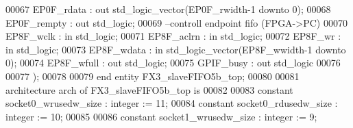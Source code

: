 \begin{DoxyCode}
00067                 \textcolor{vhdlchar}{EP0F_rdata}      \textcolor{vhdlchar}{:} \textcolor{keywordflow}{out} \textcolor{comment}{std\_logic\_vector}\textcolor{vhdlchar}{(}\textcolor{vhdlchar}{EP0F_rwidth}\textcolor{vhdlchar}{-}\textcolor{vhdllogic}{}\textcolor{vhdllogic}{1} \textcolor{keywordflow}{downto} \textcolor{vhdllogic}{}\textcolor{vhdllogic}{0}\textcolor{vhdlchar}{)};
00068                 \textcolor{vhdlchar}{EP0F_rempty}     \textcolor{vhdlchar}{:} \textcolor{keywordflow}{out} \textcolor{comment}{std\_logic};
00069 \textcolor{keyword}{                --controll endpoint fifo (FPGA->PC)}
00070                 \textcolor{vhdlchar}{EP8F_wclk}       \textcolor{vhdlchar}{:} \textcolor{keywordflow}{in} \textcolor{comment}{std\_logic};
00071                 \textcolor{vhdlchar}{EP8F_aclrn}      \textcolor{vhdlchar}{:} \textcolor{keywordflow}{in} \textcolor{comment}{std\_logic};
00072                 \textcolor{vhdlchar}{EP8F_wr}         \textcolor{vhdlchar}{:} \textcolor{keywordflow}{in} \textcolor{comment}{std\_logic};
00073                 \textcolor{vhdlchar}{EP8F_wdata}      \textcolor{vhdlchar}{:} \textcolor{keywordflow}{in} \textcolor{comment}{std\_logic\_vector}\textcolor{vhdlchar}{(}\textcolor{vhdlchar}{EP8F_wwidth}\textcolor{vhdlchar}{-}\textcolor{vhdllogic}{}\textcolor{vhdllogic}{1} \textcolor{keywordflow}{downto} \textcolor{vhdllogic}{}\textcolor{vhdllogic}{0}\textcolor{vhdlchar}{)};
00074                 \textcolor{vhdlchar}{EP8F_wfull}      \textcolor{vhdlchar}{:} \textcolor{keywordflow}{out} \textcolor{comment}{std\_logic};
00075                 \textcolor{vhdlchar}{GPIF_busy}       \textcolor{vhdlchar}{:} \textcolor{keywordflow}{out} \textcolor{comment}{std\_logic}
00076             
00077         \textcolor{vhdlchar}{)};
00078 
00079 \textcolor{keywordflow}{end} \textcolor{keywordflow}{entity} \textcolor{vhdlchar}{FX3\_slaveFIFO5b\_top};
00080 
00081 \textcolor{keywordflow}{architecture} arch \textcolor{keywordflow}{of} FX3_slaveFIFO5b_top is
00082 
00083 \textcolor{keywordflow}{constant} \textcolor{vhdlchar}{socket0_wrusedw_size} \textcolor{vhdlchar}{:} \textcolor{comment}{integer} \textcolor{vhdlchar}{:=} \textcolor{vhdllogic}{}\textcolor{vhdllogic}{11};
00084 \textcolor{keywordflow}{constant} \textcolor{vhdlchar}{socket0_rdusedw_size} \textcolor{vhdlchar}{:} \textcolor{comment}{integer} \textcolor{vhdlchar}{:=} \textcolor{vhdllogic}{}\textcolor{vhdllogic}{10}; 
00085 
00086 \textcolor{keywordflow}{constant} \textcolor{vhdlchar}{socket1_wrusedw_size} \textcolor{vhdlchar}{:} \textcolor{comment}{integer} \textcolor{vhdlchar}{:=} \textcolor{vhdllogic}{}\textcolor{vhdllogic}{9};

\end{DoxyCode}
